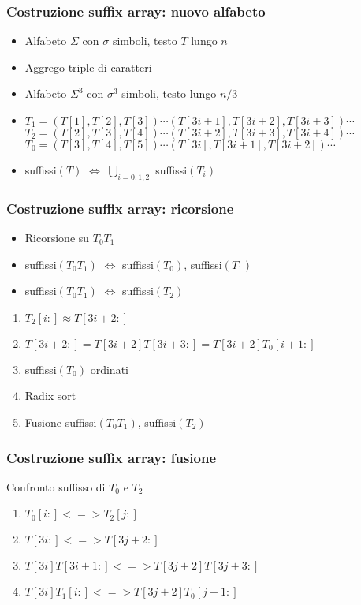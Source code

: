 \begin{frame}
	\frametitle{Costruzione suffix array: nuovo alfabeto}
	\begin{itemize}
		\item
		      Alfabeto $\Sigma$ con $\sigma$ simboli, testo $T$ lungo $n$
		\item
		      Aggrego triple di caratteri
		\item
		      Alfabeto $\Sigma^{3}$ con $\sigma^{3}$ simboli, testo lungo $n/3$
		\item
		      $T_{1}=(T[1],T[2],T[3])\cdots (T[3i+1],T[3i+2],T[3i+3])\cdots$\\
		      $T_{2}=(T[2],T[3],T[4])\cdots (T[3i+2],T[3i+3],T[3i+4])\cdots$\\
		      $T_{0}=(T[3],T[4],T[5])\cdots (T[3i],T[3i+1],T[3i+2])\cdots$
		\item
		      suffissi$(T)$ $\Leftrightarrow$ $\bigcup_{i=0,1,2}$ suffissi$(T_{i})$
	\end{itemize}
\end{frame}

\begin{frame}
	\frametitle{Costruzione suffix array: ricorsione}
	\begin{itemize}
		\item
		      Ricorsione su $T_{0}T_{1}$
		\item<+->
			suffissi$(T_{0}T_{1})$ $\Leftrightarrow$ suffissi$(T_{0})$,
			suffissi$(T_{1})$
		\item<+->
			suffissi$(T_{0}T_{1})$  $\Leftrightarrow$ suffissi$(T_{2})$
	\end{itemize}
	\begin{enumerate}[<+->]
		\item
		      $T_{2}[i:] \approx T[3i+2:]$
		\item
		      $T[3i+2:] = T[3i+2]T[3i+3:] =T[3i+2]T_{0}[i+1:]$
		\item
		      suffissi$(T_{0})$ ordinati
		\item
		      Radix sort
		\item
		      Fusione suffissi$(T_{0}T_{1})$,  suffissi$(T_{2})$
	\end{enumerate}
\end{frame}

\begin{frame}
	\frametitle{Costruzione suffix array: fusione}
	Confronto suffisso di $T_{0}$ e $T_{2}$
	\begin{enumerate}
		\item
		      $T_{0}[i:] <=> T_{2}[j:]$
		\item
		      $T[3i:] <=> T[3j+2:]$
		\item
		      $T[3i]T[3i+1:] <=> T[3j+2]T[3j+3:]$
		\item
		      $T[3i]T_{1}[i:] <=> T[3j+2]T_{0}[j+1:]$
	\end{enumerate}
\end{frame}



